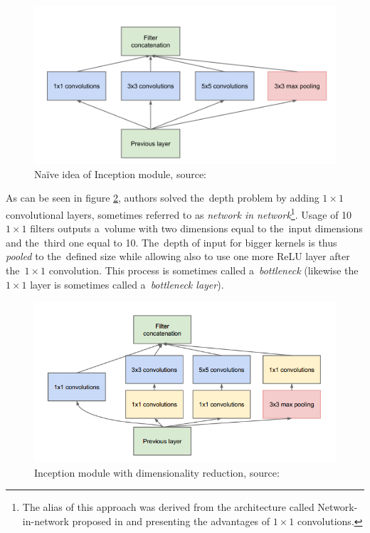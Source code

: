 \begin{figure}[H]
   \centering
	\includegraphics[width=0.8\linewidth]{./pictures/inception-naive.png}
	\caption[Inception module, naïve idea]{Naïve idea of Inception module, source: 
	\cite{googlenet}}
      \label{fig:inception-naive}
\end{figure}

As can be seen in figure \ref{fig:inception-full}, authors solved the~depth 
problem by adding $1 \times 1$ convolutional layers, sometimes referred to as 
\textit{network in network}\footnote{The alias of this approach was derived
from the architecture called Network-in-network proposed in \cite{nin} and
presenting the advantages of $1 \times 1$ convolutions.}. Usage of 10
$1 \times 1$ filters outputs a~volume with two dimensions equal to the~input
dimensions and the~third one equal to 10. The~depth of input for bigger kernels
is thus \textit{pooled} to the~defined size while allowing also to use one more
ReLU layer after the~$1 \times 1$ convolution. This process is sometimes called
a~\textit{bottleneck} (likewise the~$1 \times 1$ layer is sometimes called
a~\textit{bottleneck layer}).

\begin{figure}[H]
   \centering
	\includegraphics[width=0.8\linewidth]{./pictures/inception-full.png}
	\caption[Inception module, full]{Inception module with dimensionality 
	reduction, source: \cite{googlenet}}
      \label{fig:inception-full}
\end{figure}

